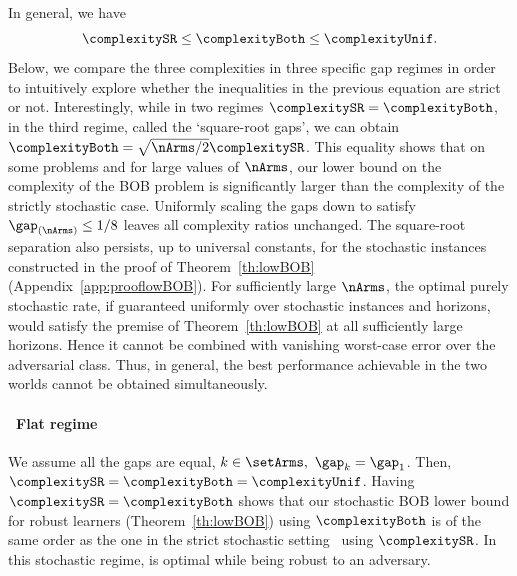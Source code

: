 %
\begin{remark}\label{rem:LOWbobCOMP}
	In general, we have
	\[
	\complexitySR\leq\complexityBoth\leq\complexityUnif.
	\]
Below, we compare the three  complexities in 
three specific gap regimes in order to intuitively explore   whether
the inequalities in the previous equation are strict or not. 
Interestingly, while in two regimes  $\complexitySR=\complexityBoth$, in the third regime, called the `square-root gaps', we can obtain $\complexityBoth=\sqrt{\nArms/2}\complexitySR$.  
This equality shows that on some problems and for large values of $\nArms$,
 our lower bound on 
the complexity of the BOB problem is 
significantly larger than the complexity of the strictly stochastic case.
Uniformly scaling the gaps down to satisfy $\gap_{(\nArms)}\leq1/8$
leaves all complexity ratios unchanged.
The square-root separation also persists, up to universal constants,
for the stochastic instances constructed in the proof of
Theorem~\ref{th:lowBOB} (Appendix~\ref{app:prooflowBOB}).
For sufficiently large $\nArms$, the optimal purely stochastic rate,
if guaranteed uniformly over stochastic instances and horizons, would
satisfy the premise of Theorem~\ref{th:lowBOB} at all sufficiently large
horizons. Hence it cannot be combined with vanishing worst-case error
over the adversarial class. Thus, in general,
the best performance achievable in the two worlds cannot be obtained
simultaneously.
	\end{remark}
	\paragraph{\raisebox{.04cm}{\textcolor{bull}{$\blacktriangleright$}}~Flat regime}  We assume all the gaps are equal, 
$k\in\setArms,~ \gap_k=\gap_{1}$. Then, 
$\complexitySR=\complexityBoth=\complexityUnif$. Having $\complexitySR=\complexityBoth$  shows that our  
stochastic BOB lower bound for robust learners (Theorem~\ref{th:lowBOB}) using $\complexityBoth$ is of the same order as the one in the 
strict stochastic setting~\citep{Audibert10BA} using $\complexitySR$.   
In this stochastic regime, \RULE{} is optimal while being robust to an adversary.
%
